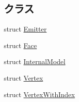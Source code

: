 \subsection*{クラス}
\begin{DoxyCompactItemize}
\item 
struct \mbox{\hyperlink{struct_effekseer_1_1_model_1_1_emitter}{Emitter}}
\item 
struct \mbox{\hyperlink{struct_effekseer_1_1_model_1_1_face}{Face}}
\item 
struct \mbox{\hyperlink{struct_effekseer_1_1_model_1_1_internal_model}{Internal\+Model}}
\item 
struct \mbox{\hyperlink{struct_effekseer_1_1_model_1_1_vertex}{Vertex}}
\item 
struct \mbox{\hyperlink{struct_effekseer_1_1_model_1_1_vertex_with_index}{Vertex\+With\+Index}}
\end{DoxyCompactItemize}
